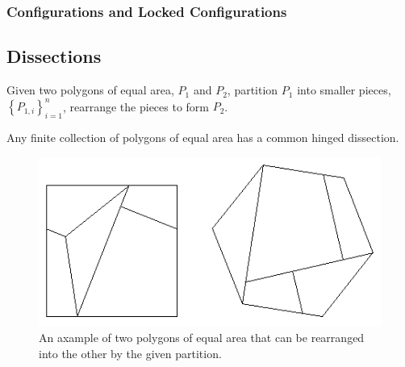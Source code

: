 \subsubsection{Configurations and Locked Configurations}
\subsection{Dissections}
\begin{prob}\label{def:dissection}
Given two polygons of equal area, $P_1$ and $P_2$, partition $P_1$ into smaller
pieces,$\left\lbrace P_{1,i}\right\rbrace_{i=1}^n $, rearrange the pieces to
form $P_2$. \cite{frederickson1997dissections}
\end{prob}
\begin{thm}[]\label{thm}
Any finite collection of polygons of equal area has a common hinged dissection.
\cite{abbott2012hinged}
\end{thm}
\begin{figure}[h]
\begin{center}
\includegraphics[scale=.3]{graphics/polygonaldissection.png}
\caption{An axample of two polygons of equal area that can be rearranged into
the other by the given partition.\cite{davidEppstienJunkyard}}
\label{fig:polygonaldissection}
\end{center}
\end{figure}